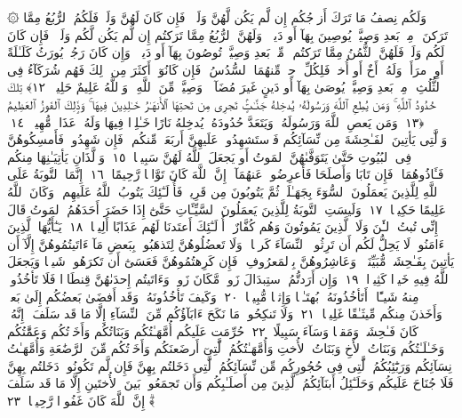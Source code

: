  ۞ وَلَكُم نِصفُ مَا تَرَكَ أَزوَٟجُكُم إِن لَّم يَكُن لَّهُنَّ وَلَدٌۭ ۚ فَإِن كَانَ لَهُنَّ وَلَدٌۭ فَلَكُمُ ٱلرُّبُعُ مِمَّا تَرَكنَ ۚ مِنۢ بَعدِ وَصِيَّةٍۢ يُوصِينَ بِهَآ أَو دَينٍۢ ۚ وَلَهُنَّ ٱلرُّبُعُ مِمَّا تَرَكتُم إِن لَّم يَكُن لَّكُم وَلَدٌۭ ۚ فَإِن كَانَ لَكُم وَلَدٌۭ فَلَهُنَّ ٱلثُّمُنُ مِمَّا تَرَكتُم ۚ مِّنۢ بَعدِ وَصِيَّةٍۢ تُوصُونَ بِهَآ أَو دَينٍۢ ۗ وَإِن كَانَ رَجُلٌۭ يُورَثُ كَلَـٰلَةً أَوِ ٱمرَأَةٌۭ وَلَهُۥٓ أَخٌ أَو أُختٌۭ فَلِكُلِّ وَٟحِدٍۢ مِّنهُمَا ٱلسُّدُسُ ۚ فَإِن كَانُوٓا۟ أَكثَرَ مِن ذَٟلِكَ فَهُم شُرَكَآءُ فِى ٱلثُّلُثِ ۚ مِنۢ بَعدِ وَصِيَّةٍۢ يُوصَىٰ بِهَآ أَو دَينٍ غَيرَ مُضَآرٍّۢ ۚ وَصِيَّةًۭ مِّنَ ٱللَّهِ ۗ وَٱللَّهُ عَلِيمٌ حَلِيمٌۭ ﴿١٢﴾
 تِلكَ حُدُودُ ٱللَّهِ ۚ وَمَن يُطِعِ ٱللَّهَ وَرَسُولَهُۥ يُدخِلهُ جَنَّـٰتٍۢ تَجرِى مِن تَحتِهَا ٱلأَنهَـٰرُ خَـٰلِدِينَ فِيهَا ۚ وَذَٟلِكَ ٱلفَوزُ ٱلعَظِيمُ ﴿١٣﴾
 وَمَن يَعصِ ٱللَّهَ وَرَسُولَهُۥ وَيَتَعَدَّ حُدُودَهُۥ يُدخِلهُ نَارًا خَـٰلِدًۭا فِيهَا وَلَهُۥ عَذَابٌۭ مُّهِينٌۭ ﴿١٤﴾
 وَٱلَّٰتِى يَأتِينَ ٱلفَـٰحِشَةَ مِن نِّسَآئِكُم فَٱستَشهِدُوا۟ عَلَيهِنَّ أَربَعَةًۭ مِّنكُم ۖ فَإِن شَهِدُوا۟ فَأَمسِكُوهُنَّ فِى ٱلبُيُوتِ حَتَّىٰ يَتَوَفَّىٰهُنَّ ٱلمَوتُ أَو يَجعَلَ ٱللَّهُ لَهُنَّ سَبِيلًۭا ﴿١٥﴾
 وَٱلَّذَانِ يَأتِيَـٰنِهَا مِنكُم فَـَٔاذُوهُمَا ۖ فَإِن تَابَا وَأَصلَحَا فَأَعرِضُوا۟ عَنهُمَآ ۗ إِنَّ ٱللَّهَ كَانَ تَوَّابًۭا رَّحِيمًا ﴿١٦﴾
 إِنَّمَا ٱلتَّوبَةُ عَلَى ٱللَّهِ لِلَّذِينَ يَعمَلُونَ ٱلسُّوٓءَ بِجَهَـٰلَةٍۢ ثُمَّ يَتُوبُونَ مِن قَرِيبٍۢ فَأُو۟لَـٰٓئِكَ يَتُوبُ ٱللَّهُ عَلَيهِم ۗ وَكَانَ ٱللَّهُ عَلِيمًا حَكِيمًۭا ﴿١٧﴾
 وَلَيسَتِ ٱلتَّوبَةُ لِلَّذِينَ يَعمَلُونَ ٱلسَّيِّـَٔاتِ حَتَّىٰٓ إِذَا حَضَرَ أَحَدَهُمُ ٱلمَوتُ قَالَ إِنِّى تُبتُ ٱلـَٰٔنَ وَلَا ٱلَّذِينَ يَمُوتُونَ وَهُم كُفَّارٌ ۚ أُو۟لَـٰٓئِكَ أَعتَدنَا لَهُم عَذَابًا أَلِيمًۭا ﴿١٨﴾
 يَـٰٓأَيُّهَا ٱلَّذِينَ ءَامَنُوا۟ لَا يَحِلُّ لَكُم أَن تَرِثُوا۟ ٱلنِّسَآءَ كَرهًۭا ۖ وَلَا تَعضُلُوهُنَّ لِتَذهَبُوا۟ بِبَعضِ مَآ ءَاتَيتُمُوهُنَّ إِلَّآ أَن يَأتِينَ بِفَـٰحِشَةٍۢ مُّبَيِّنَةٍۢ ۚ وَعَاشِرُوهُنَّ بِٱلمَعرُوفِ ۚ فَإِن كَرِهتُمُوهُنَّ فَعَسَىٰٓ أَن تَكرَهُوا۟ شَيـًۭٔا وَيَجعَلَ ٱللَّهُ فِيهِ خَيرًۭا كَثِيرًۭا ﴿١٩﴾
 وَإِن أَرَدتُّمُ ٱستِبدَالَ زَوجٍۢ مَّكَانَ زَوجٍۢ وَءَاتَيتُم إِحدَىٰهُنَّ قِنطَارًۭا فَلَا تَأخُذُوا۟ مِنهُ شَيـًٔا ۚ أَتَأخُذُونَهُۥ بُهتَـٰنًۭا وَإِثمًۭا مُّبِينًۭا ﴿٢٠﴾
 وَكَيفَ تَأخُذُونَهُۥ وَقَد أَفضَىٰ بَعضُكُم إِلَىٰ بَعضٍۢ وَأَخَذنَ مِنكُم مِّيثَـٰقًا غَلِيظًۭا ﴿٢١﴾
 وَلَا تَنكِحُوا۟ مَا نَكَحَ ءَابَآؤُكُم مِّنَ ٱلنِّسَآءِ إِلَّا مَا قَد سَلَفَ ۚ إِنَّهُۥ كَانَ فَـٰحِشَةًۭ وَمَقتًۭا وَسَآءَ سَبِيلًا ﴿٢٢﴾
 حُرِّمَت عَلَيكُم أُمَّهَـٰتُكُم وَبَنَاتُكُم وَأَخَوَٟتُكُم وَعَمَّٰتُكُم وَخَـٰلَـٰتُكُم وَبَنَاتُ ٱلأَخِ وَبَنَاتُ ٱلأُختِ وَأُمَّهَـٰتُكُمُ ٱلَّٰتِىٓ أَرضَعنَكُم وَأَخَوَٟتُكُم مِّنَ ٱلرَّضَٰعَةِ وَأُمَّهَـٰتُ نِسَآئِكُم وَرَبَٰٓئِبُكُمُ ٱلَّٰتِى فِى حُجُورِكُم مِّن نِّسَآئِكُمُ ٱلَّٰتِى دَخَلتُم بِهِنَّ فَإِن لَّم تَكُونُوا۟ دَخَلتُم بِهِنَّ فَلَا جُنَاحَ عَلَيكُم وَحَلَـٰٓئِلُ أَبنَآئِكُمُ ٱلَّذِينَ مِن أَصلَـٰبِكُم وَأَن تَجمَعُوا۟ بَينَ ٱلأُختَينِ إِلَّا مَا قَد سَلَفَ ۗ إِنَّ ٱللَّهَ كَانَ غَفُورًۭا رَّحِيمًۭا ﴿٢٣﴾
